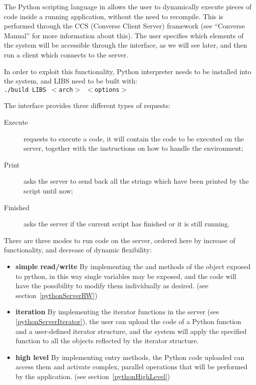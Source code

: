 The Python scripting language in \charmpp{} allows the user to dynamically
execute pieces of code inside a running application, without the need to
recompile. This is performed through the CCS (Converse Client Server) framework
(see ``Converse Manual'' for more information about this). The user specifies
which elements of the system will be accessible through the interface, as we
will see later, and then run a client which connects to the server.

In order to exploit this functionality, Python interpreter needs to be installed
into the system, and \charmpp{} LIBS need to be built with:\\
\texttt{./build LIBS $<$arch$>$ $<$options$>$}

The interface provides three different types of requests:

\begin{description}
\item[Execute] requests to execute a code, it will contain the code to be executed on the server, together with the instructions on how to handle the environment;
\item[Print] asks the server to send back all the strings which have been printed by the script until now;
\item[Finished] asks the server if the current script has finished or it is still running.
\end{description}

There are three modes to run code on the server, ordered here by increase of
functionality, and decrease of dynamic flexibility:
\begin{itemize}
\item \textbf{simple read/write} By implementing the  and  methods
of the object exposed to python, in this way single variables may be exposed,
and the code will have the possibility to modify them individually as desired.
(see section~\ref{pythonServerRW})
\item \textbf{iteration} By implementing the iterator functions in the server (see
\ref{pythonServerIterator}), the user can upload the code of a Python function
and a user-defined iterator structure, and the system will apply the specified
function to all the objects reflected by the iterator structure.
\item \textbf{high level} By implementing  entry methods, the Python code uploaded can access them and activate complex, parallel operations that will be performed by the \charmpp{} application. (see section~\ref{pythonHighLevel})
\end{itemize}

